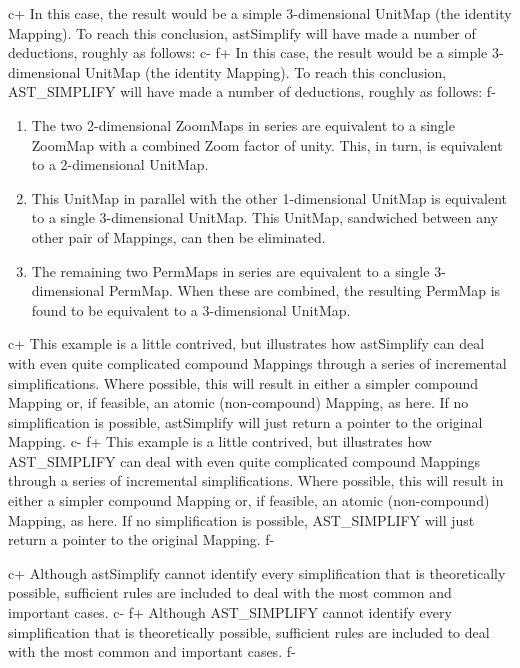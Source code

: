 \documentclass[twoside,11pt]{article}
\begin{document}
c+
In this case, the result would be a simple 3-dimensional UnitMap (the
identity Mapping).  To reach this conclusion, astSimplify will have
made a number of deductions, roughly as follows:
c-
f+
In this case, the result would be a simple 3-dimensional UnitMap (the
identity Mapping).  To reach this conclusion, AST\_SIMPLIFY will have
made a number of deductions, roughly as follows:
f-

\begin{enumerate}
\item The two 2-dimensional ZoomMaps in series are equivalent to a
single ZoomMap with a combined Zoom factor of unity. This, in turn, is
equivalent to a 2-dimensional UnitMap.

\item This UnitMap in parallel with the other 1-dimensional UnitMap is
equivalent to a single 3-dimensional UnitMap. This UnitMap, sandwiched
between any other pair of Mappings, can then be eliminated.

\item The remaining two PermMaps in series are equivalent to a single
3-dimensional PermMap. When these are combined, the resulting PermMap
is found to be equivalent to a 3-dimensional UnitMap.
\end{enumerate}

c+
This example is a little contrived, but illustrates how astSimplify
can deal with even quite complicated compound Mappings through a
series of incremental simplifications. Where possible, this will
result in either a simpler compound Mapping or, if feasible, an atomic
(non-compound) Mapping, as here. If no simplification is possible,
astSimplify will just return a pointer to the original Mapping.
c-
f+
This example is a little contrived, but illustrates how AST\_SIMPLIFY
can deal with even quite complicated compound Mappings through a
series of incremental simplifications. Where possible, this will
result in either a simpler compound Mapping or, if feasible, an atomic
(non-compound) Mapping, as here. If no simplification is possible,
AST\_SIMPLIFY will just return a pointer to the original Mapping.
f-

c+
Although astSimplify cannot identify every simplification that is
theoretically possible, sufficient rules are included to deal with the
most common and important cases.
c-
f+
Although AST\_SIMPLIFY cannot identify every simplification that is
theoretically possible, sufficient rules are included to deal with the
most common and important cases.
f-
\end{document}

